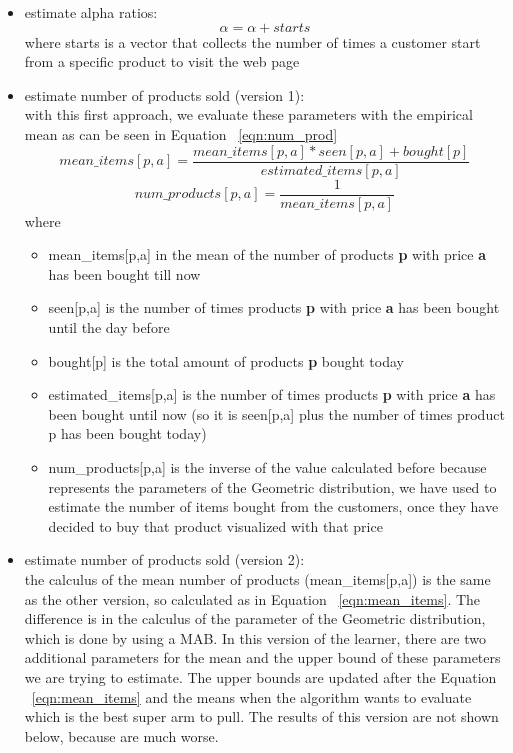 \begin{itemize}
    \item estimate alpha ratios:\begin{equation}
        \label{eqn:alpha}
        \alpha = \alpha + starts
    \end{equation}where starts is a vector that collects the number of times a customer start from a specific product to visit the web page
    \item estimate number of products sold (version 1):\\
    with this first approach, we evaluate these parameters with the empirical mean as can be seen in Equation ~\ref{eqn:num_prod} \begin{equation}
        \label{eqn:mean_items}
        mean\_items[p,a] = \frac{mean\_items[p,a] * seen[p,a] + bought[p]}{estimated\_items[p,a]}
    \end{equation}\begin{equation}
        \label{eqn:num_prod}
        num\_products[p,a] = \frac{1}{mean\_items[p,a]}
    \end{equation}where\begin{itemize}
        \item mean\_items[p,a] in the mean of the number of products {\bf p} with price {\bf a} has been bought till now
        \item seen[p,a] is the number of times products {\bf p} with price {\bf a} has been bought until the day before
        \item bought[p] is the total amount of products {\bf p} bought today
        \item estimated\_items[p,a] is the number of times products {\bf p} with price {\bf a} has been bought until now (so it is seen[p,a] plus the number of times product p has been bought today)
        \item num\_products[p,a] is the inverse of the value calculated before because represents the parameters of the Geometric distribution, we have used to estimate the number of items bought from the customers, once they have decided to buy that product visualized with that price
    \end{itemize}
    \item estimate number of products sold (version 2):\\
    the calculus of the mean number of products (mean\_items[p,a]) is the same as the other version, so calculated as in Equation ~\ref{eqn:mean_items}. The difference is in the calculus of the parameter of the Geometric distribution, which is done by using a MAB. In this version of the learner, there are two additional parameters for the mean and the upper bound of these parameters we are trying to estimate. The upper bounds are updated after the Equation ~\ref{eqn:mean_items} and the means when the algorithm wants to evaluate which is the best super arm to pull. The results of this version are not shown below, because are much worse.
\end{itemize}
